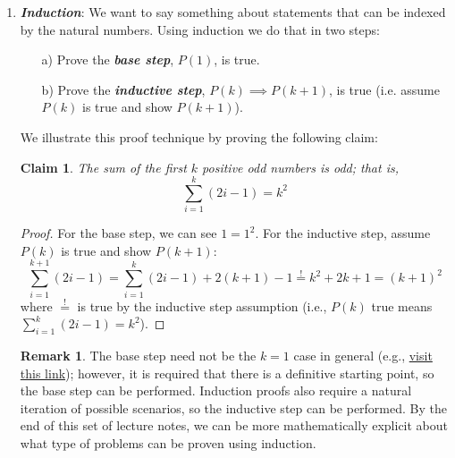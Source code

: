 \documentclass{article}
\newcommand{\keyword}[1]{\textit{\textbf{#1}}\index{#1}}
\newtheorem{claim}{Claim}
\theoremstyle{definition}
\newtheorem{remark}{Remark}
\begin{document}
\begin{enumerate}
\begin{proof}[Proof for Claim~\ref{claim:sqrt2_irrational}]
        \begin{equation*}
            p = 2k
        \end{equation*}
        Plugging this into \eqref{eq:sqrt(2)_irrational_eq} gives us 
        \begin{equation*}
            2q^2 = 4k^2 \Rightarrow q^2 = 2k^2
        \end{equation*}
        Thus, $q^2$ is even which implies that $q$ is even by Claim~\ref{claim:sqrt2_irrational_lem}. But then $p$ and $q$ are both divisible by 2, contradicting $p$ and $q$ being co-prime. 
    \end{proof}

    \item \keyword{Induction}: We want to say something about statements that can be indexed by the natural numbers. Using induction we do that in two steps:
    \begin{enumerate}
      \item[a)] Prove the \keyword{base step}, $P(1)$, is true.

      \item[b)] Prove the \keyword{inductive step}, $P(k) \implies P(k + 1)$, is true (i.e. assume $P(k)$ is true and show $P(k + 1)$).
  \end{enumerate}
  We illustrate this proof technique by proving the following claim:
  \begin{claim}
      The sum of the first $k$ positive odd numbers is odd; that is, 
      \begin{equation*}
          \sum_{i=1}^k (2i - 1) = k^2
      \end{equation*}
  \end{claim}
  \begin{proof}
      For the base step, we can see $1 = 1^2$. For the inductive step, assume $P(k)$ is true and show $P(k + 1)$:
          \begin{equation*}
              \sum^{k + 1}_{i = 1} (2i - 1)
            =
            \sum^{k}_{i = 1} (2i - 1)
            +
            2(k + 1) - 1
            \stackrel{!}{=}
            k^2
            +
            2k
            +
            1
            =
            (k +  1)^2
          \end{equation*}
          where $\stackrel{!}{=}$ is true by the inductive step assumption (i.e., $P(k)$ true means $\sum^{k}_{i = 1} (2i - 1) = k^2$).
  \end{proof}
  \begin{remark}
      The base step need not be the $k=1$ case in general (e.g., \href{https://en.wikipedia.org/wiki/Mathematical_induction#Base_case_other_than_0_or_1}{visit this link}); however, it is required that there is a definitive starting point, so the base step can be performed. Induction proofs also require a natural iteration of possible scenarios, so the inductive step can be performed. By the end of this set of lecture notes, we can be more mathematically explicit about what type of problems can be proven using induction. 
  \end{remark}
\end{enumerate}
\end{document}
